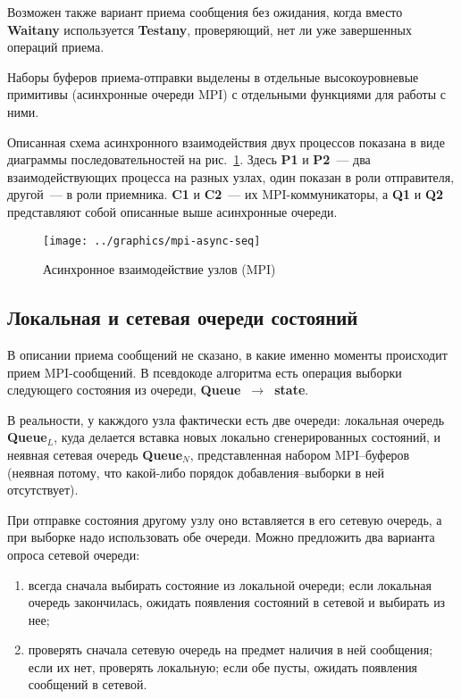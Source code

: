 \documentclass[12pt,a4paper,fleqn]{article}
\newcommand{\Code}[1]{\textbf{\mbox{#1}}}
\begin{document}
Возможен также вариант приема сообщения без ожидания, когда вместо \Code{Waitany} используется
\Code{Testany}, проверяющий, нет ли уже завершенных операций приема.

Наборы буферов приема-отправки выделены в отдельные высокоуровневые примитивы (асинхронные
очереди MPI) с отдельными функциями для работы с ними.

Описанная схема асинхронного взаимодействия двух процессов показана в виде диаграммы
последовательностей на рис.~\ref{fig:mpi-async-seq}. Здесь \Code{P1} и \Code{P2}~--- два
взаимодействующих процесса на разных узлах, один показан в роли отправителя, другой~--- в роли
приемника. \Code{C1} и \Code{C2}~--- их MPI-коммуникаторы, а \Code{Q1} и \Code{Q2} представляют
собой описанные выше асинхронные очереди.

\begin{figure}[ht]
  \centering
  \texttt{[image: ../graphics/mpi-async-seq]}  
  \caption{Асинхронное взаимодействие узлов (MPI)}
  \label{fig:mpi-async-seq}
\end{figure}

\subsection{Локальная и сетевая очереди состояний}

В описании приема сообщений не сказано, в какие именно моменты происходит прием MPI-сообщений. В
псевдокоде алгоритма есть операция выборки следующего состояния из очереди, \Code{Queue
  $\rightarrow$ state}.

В реальности, у какждого узла фактически есть две очереди: локальная очередь \Code{Queue$_L$}, куда
делается вставка новых локально сгенерированных состояний, и неявная сетевая очередь
\Code{Queue$_N$}, представленная набором MPI--буферов (неявная потому, что какой-либо порядок
добавления--выборки в ней отсутствует).

При отправке состояния другому узлу оно вставляется в его сетевую очередь, а при выборке надо
использовать обе очереди. Можно предложить два варианта опроса сетевой очереди:
\begin{enumerate}
\item всегда сначала выбирать состояние из локальной очереди; если локальная очередь закончилась,
  ожидать появления состояний в сетевой и выбирать из нее;
\item проверять сначала сетевую очередь на предмет наличия в ней сообщения; если их нет, проверять
  локальную; если обе пусты, ожидать появления сообщений в сетевой.
\end{enumerate}
\end{document}
